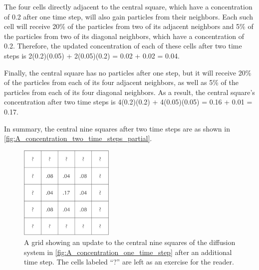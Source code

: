 The four cells directly adjacent to the central square, which have a concentration of 0.2 after one time step, will also gain particles from their neighbors. Each such cell will receive 20\% of the particles from two of its adjacent neighbors and 5\% of the particles from two of its diagonal neighbors, which have a concentration of 0.2. Therefore, the updated concentration of each of these cells after two time steps is 2(0.2)(0.05) + 2(0.05)(0.2) = 0.02 + 0.02 = 0.04.

Finally, the central square has no particles after one step, but it will receive 20\% of the particles from each of its four adjacent neighbors, as well as 5\% of the particles from each of its four diagonal neighbors. As a result, the central square's concentration after two time steps is 4(0.2)(0.2) + 4(0.05)(0.05) = 0.16 + 0.01 = 0.17.

In summary, the central nine squares after two time steps are as shown in \autoref{fig:A_concentration_two_time_steps_partial}.\\

\begin{figure}[h]
\centering
\mySfFamily
\includegraphics[width = 0.4\textwidth]{../images/A_concentration_two_time_steps_partial.png}
\caption{A grid showing an update to the central nine squares of the diffusion system in \autoref{fig:A_concentration_one_time_step} after an additional time step. The cells labeled ``?'' are left as an exercise for the reader.}
\label{fig:A_concentration_two_time_steps_partial}
\end{figure}

\begin{qbox}\end{qbox}

